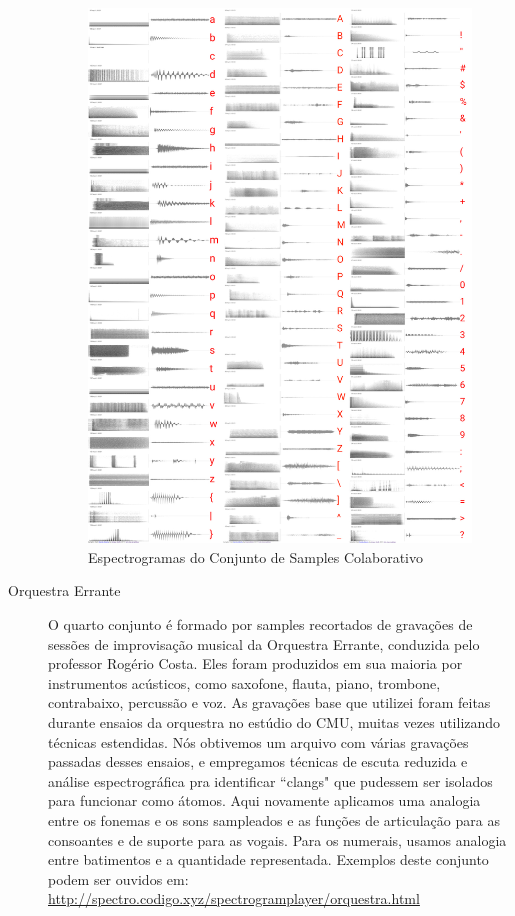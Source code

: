 \begin{description}
\begin{figure}[htb]
    \caption{\label{samplescolab}Espectrogramas do Conjunto de Samples Colaborativo}
    \begin{center}
        \includegraphics[width=0.7\linewidth]{pictures/cap3/bandaabertacolab.jpg}
    \end{center}
\end{figure}

\item[Orquestra Errante] O quarto conjunto é formado por samples recortados de gravações de sessões de improvisação musical da Orquestra Errante, conduzida pelo professor Rogério Costa. Eles foram produzidos em sua maioria por instrumentos acústicos, como saxofone, flauta, piano, trombone, contrabaixo, percussão e voz. As gravações base que utilizei foram feitas durante ensaios da orquestra no estúdio do CMU, muitas vezes utilizando técnicas estendidas. Nós obtivemos um arquivo com várias gravações passadas desses ensaios, e empregamos técnicas de escuta reduzida e análise espectrográfica pra identificar ``clangs" que pudessem ser isolados para funcionar como átomos. Aqui novamente aplicamos uma analogia entre os fonemas e os sons sampleados e as funções de articulação para as consoantes e de suporte para as vogais. Para os numerais, usamos analogia entre batimentos e a quantidade representada. Exemplos deste conjunto podem ser ouvidos em: \url{http://spectro.codigo.xyz/spectrogramplayer/orquestra.html}
\end{description}

